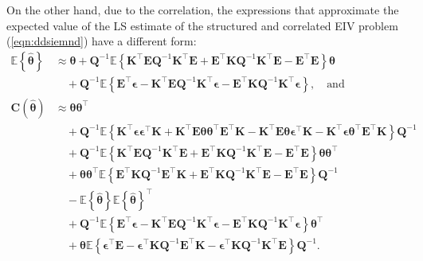 On the other hand, due to the correlation, the expressions that approximate the expected value of the LS estimate of the structured and correlated EIV problem (\ref{eqn:ddsiemnd}) have a different form:
\begin{equation} \begin{aligned} \mathbb{E} \left\{ \widehat{\bm{\theta}} \right\} & \approx \bm{\theta}  +  \mathbf{Q}^{-1} \mathbb{E} \left\{ \mathbf{K}^\top \mathbf{E} \mathbf{Q}^{-1} \mathbf{K}^\top \mathbf{E} + \mathbf{E}^\top \mathbf{K} \mathbf{Q}^{-1} \mathbf{K}^\top \mathbf{E} - \mathbf{E}^\top \mathbf{E}  \right\} \bm{\theta} \\ 
& \quad + \mathbf{Q}^{-1} \mathbb{E} \left\{ \mathbf{E}^\top \bm{\epsilon} - \mathbf{K}^\top \mathbf{E} \mathbf{Q}^{-1} \mathbf{K}^\top \bm{\epsilon} - \mathbf{E}^\top \mathbf{K} \mathbf{Q}^{-1} \mathbf{K}^\top \bm{\epsilon} \right\} , \quad \text{and}  \\ 
\mathbf{C} \left( \widehat{\bm{\theta}} \right)  & \approx \bm{\theta} \bm{\theta}^\top \\
& \quad + \mathbf{Q}^{-1} \mathbb{E} \left\{ \mathbf{K}^\top \bm{\epsilon} \bm{\epsilon}^\top \mathbf{K} + \mathbf{K}^\top \mathbf{E} \bm{\theta} \bm{\theta}^\top \mathbf{E}^\top \mathbf{K} - \mathbf{K}^\top \mathbf{E} \bm{\theta} \bm{\epsilon}^\top \mathbf{K} - \mathbf{K}^\top \bm{\epsilon} \bm{\theta}^\top \mathbf{E}^\top \mathbf{K} \right\} \mathbf{Q}^{-1}  \\
& \quad + \mathbf{Q}^{-1} \mathbb{E} \left\{ \mathbf{K}^\top \mathbf{E} \mathbf{Q}^{-1} \mathbf{K}^\top \mathbf{E} + \mathbf{E}^\top \mathbf{K} \mathbf{Q}^{-1} \mathbf{K}^\top \mathbf{E} - \mathbf{E}^\top \mathbf{E} \right\} \bm{\theta} \bm{\theta}^\top \\
& \quad + \bm{\theta} \bm{\theta}^\top \mathbb{E} \left\{ \mathbf{E}^\top \mathbf{K} \mathbf{Q}^{-1} \mathbf{E}^\top \mathbf{K} + \mathbf{E}^\top \mathbf{K} \mathbf{Q}^{-1} \mathbf{K}^\top \mathbf{E} - \mathbf{E}^\top \mathbf{E} \right\} \mathbf{Q}^{-1} \\
& \quad - \mathbb{E} \left\{ \widehat{\bm{\theta}} \right\} \mathbb{E} \left\{ \widehat{\bm{\theta}} \right\}^\top \\ 
& \quad + \mathbf{Q}^{-1} \mathbb{E} \left\{ \mathbf{E}^\top \bm{\epsilon} - \mathbf{K}^\top \mathbf{E} \mathbf{Q}^{-1} \mathbf{K}^\top \bm{\epsilon} - \mathbf{E}^\top \mathbf{K} \mathbf{Q}^{-1} \mathbf{K}^\top \bm{\epsilon} \right\} \bm{\theta}^\top \\
& \quad + \bm{\theta} \mathbb{E} \left\{ \bm{\epsilon}^\top \mathbf{E} - \bm{\epsilon}^\top \mathbf{K} \mathbf{Q}^{-1} \mathbf{E}^\top \mathbf{K} - \bm{\epsilon}^\top \mathbf{K} \mathbf{Q}^{-1} \mathbf{K}^\top \mathbf{E} \right\} \mathbf{Q}^{-1}. \label{eqn:EC_E} \end{aligned} \end{equation} 
